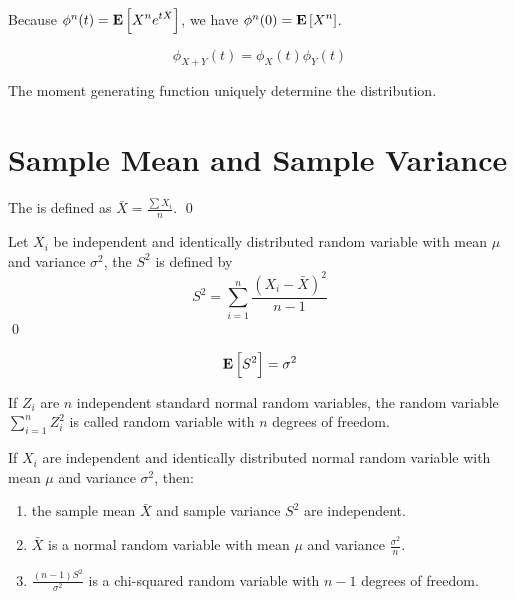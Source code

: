 Because $\phi^n (t) = \mathop{\bf E\/}\displaystyle \left[ X^n e^{tX} \right]$, we have $\phi^n(0) = \mathop{\bf E\/}\displaystyle \left[ X^n \right]$.

\begin{theorem}
    \begin{equation}
        \phi_{X+Y}(t) = \phi_X(t) \phi_Y(t)
    \end{equation}    
\end{theorem}

\begin{theorem}
The moment generating function uniquely determine the distribution.    
\end{theorem}




\section{Sample Mean and Sample Variance}

\begin{definition}
    The  is defined as $\displaystyle \bar{X} = \frac{\sum X_i}{n}$.
    \qed
\end{definition}

\begin{definition}
    Let $X_i$ be independent and identically distributed random variable with mean $\mu$ and variance $\sigma^2$, the  $S^2$ is defined by 
\begin{equation}
    S^2 = \sum_{i=1}^n \displaystyle \frac{(X_i - \bar{X})^2}{n - 1}
\end{equation} 
\qed
\end{definition}

\begin{theorem}
\begin{equation}
    \mathop{\bf E\/}\displaystyle \left[ S^2 \right] = \sigma^2
\end{equation}    
\end{theorem}


\begin{definition}
    If $Z_i$ are $n$ independent standard normal random variables, the random variable $\displaystyle \sum_{i=1}^n Z_i^2$ is called  random variable with $n$ degrees of freedom.
\end{definition}

\begin{theorem}
If $X_i$ are independent and identically distributed normal random variable with mean $\mu$ and variance $\sigma^2$, then:
    \begin{enumerate}
        \item the sample mean $\bar{X}$ and sample variance $S^2$ are independent.
        \item $\bar{X}$ is a normal random variable with mean $\mu$ and variance $\displaystyle \frac{\sigma^2}{n}$.
        \item $\displaystyle \frac{(n-1)S^2}{\sigma^2}$ is a chi-squared random variable with $n-1$ degrees of freedom.
    \end{enumerate}   
\end{theorem}

